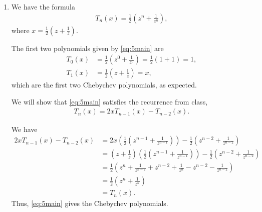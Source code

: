 \documentclass[10pt]{article}
\begin{document}
\begin{enumerate}
\begin{proof}
\begin{align*}
      0 = <\phi _{k-2}, \phi _k> &= (x-b_k)<\phi _{k-2}, \phi _{k-1}> - c_k<\phi _{k-2}, \phi_{k-2}> \\
      &= <x\phi _{k-2}, \phi _{k-1}> - b_k<\phi _{k-2}, \phi _{k-1}> - c_k<\phi _{k-2}, \phi_{k-2}> \\
      &= <x\phi _{k-1}, \phi _{k-2}> - c_k<\phi _{k-2}, \phi_{k-2}>,
  \end{align*} which is satisfied by the choice \begin{align*}
      c_k = \frac{<x\phi _{k-1}, \phi _{k-2}>}{<\phi _{k-2}, \phi_{k-2}>}.
  \end{align*}

  Thus, the three term recursion generates orthogonal polynomials.

  \end{proof}

  \newpage
  \item We have the formula \begin{align}\label{eq:5main}
      T_n(x) = \frac{1}{2}\left( z^n + \frac{1}{z^n} \right),
  \end{align} where \(x = \frac{1}{2}(z+\frac{1}{z})\).
  
  The first two polynomials given by \eqref{eq:5main} are \begin{align*}
      T_0(x) &= \frac{1}{2}\left( z^0 + \frac{1}{z^0} \right) = \frac{1}{2}(1+1) = 1, \\
      T_1(x) &= \frac{1}{2}\left( z+\frac{1}{z} \right) = x,
  \end{align*} which are the first two Chebychev polynomials, as expected.

  We will show that \eqref{eq:5main} satisfies the recurrence from class, \begin{align*}
      T_n(x) = 2xT_{n-1}(x) - T_{n-2}(x).
  \end{align*}
  
  We have \begin{align*}
      2xT_{n-1}(x) - T_{n-2}(x) &= 2x\left( \frac{1}{2} \left( z^{n-1} + \frac{1}{z^{n-1}} \right) \right) - \frac{1}{2} \left( z^{n-2} + \frac{1}{z^{n-2}} \right) \\
      &= \left( z + \frac{1}{z} \right)\left( \frac{1}{2} \left( z^{n-1} + \frac{1}{z^{n-1}} \right) \right) - \frac{1}{2} \left( z^{n-2} + \frac{1}{z^{n-2}} \right) \\
      &= \frac{1}{2} \left( z^n + \frac{1}{z^{n-2}} + z^{n-2} + \frac{1}{z^n} - z^{n-2} - \frac{1}{z^{n-2}} \right) \\
      &= \frac{1}{2} \left( z^n +\frac{1}{z^n} \right) \\
      &= T_n(x).
  \end{align*} Thus, \eqref{eq:5main} gives the Chebychev polynomials.

\end{enumerate}
\end{document}

